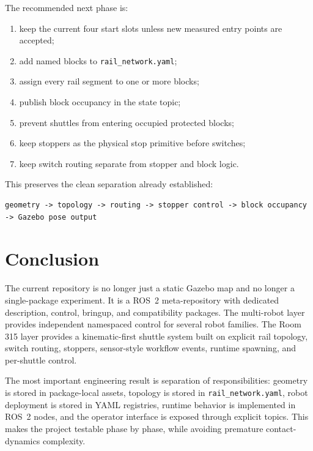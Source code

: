 \documentclass[12pt,a4paper]{report}
\begin{document}
The recommended next phase is:

\begin{enumerate}
\item keep the current four start slots unless new measured entry points are
accepted;
\item add named blocks to \texttt{rail\_network.yaml};
\item assign every rail segment to one or more blocks;
\item publish block occupancy in the state topic;
\item prevent shuttles from entering occupied protected blocks;
\item keep stoppers as the physical stop primitive before switches;
\item keep switch routing separate from stopper and block logic.
\end{enumerate}

This preserves the clean separation already established:

\begin{lstlisting}[style=terminalcode]
geometry -> topology -> routing -> stopper control -> block occupancy -> Gazebo pose output
\end{lstlisting}

\chapter{Conclusion}

The current repository is no longer just a static Gazebo map and no longer a
single-package experiment. It is a ROS~2 meta-repository with dedicated
description, control, bringup, and compatibility packages. The multi-robot
layer provides independent namespaced control for several robot families. The
Room 315 layer provides a kinematic-first shuttle system built on explicit rail
topology, switch routing, stoppers, sensor-style workflow events, runtime
spawning, and per-shuttle control.

The most important engineering result is separation of responsibilities:
geometry is stored in package-local assets, topology is stored in
\texttt{rail\_network.yaml}, robot deployment is stored in YAML registries,
runtime behavior is implemented in ROS~2 nodes, and the operator interface is
exposed through explicit topics. This makes the project testable phase by
phase, while avoiding premature contact-dynamics complexity.
\end{document}
